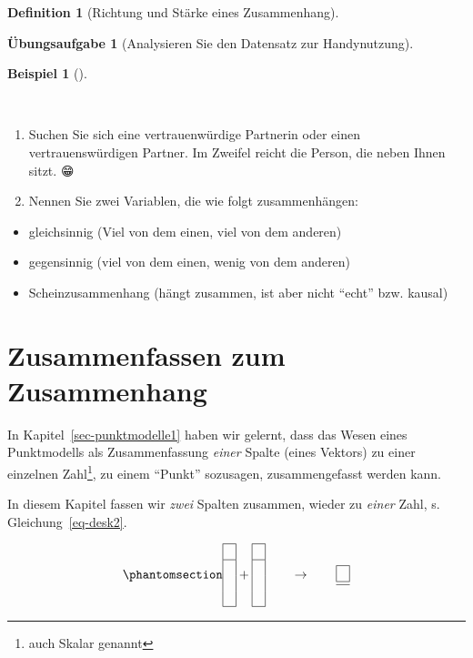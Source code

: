 \documentclass[
  a4paper,
  DIV=11]{scrreprt}
\providecommand{\tightlist}{%
  \setlength{\itemsep}{0pt}\setlength{\parskip}{0pt}}\usepackage{longtable,booktabs,array}
\theoremstyle{definition}
\newtheorem{exercise}{Übungsaufgabe}[chapter]
\theoremstyle{definition}
\newtheorem{example}{Beispiel}[chapter]
\theoremstyle{definition}
\newtheorem{definition}{Definition}[chapter]
\theoremstyle{remark}
\begin{document}
\begin{definition}[Richtung und Stärke eines
Zusammenhang]
\begin{exercise}[Analysieren Sie den Datensatz zur
Handynutzung]
\begin{example}[]\protect\hypertarget{exm-zsgh-studis}{}\label{exm-zsgh-studis}

~

\begin{enumerate}
\def\labelenumi{\arabic{enumi}.}
\tightlist
\item
  Suchen Sie sich eine vertrauenwürdige Partnerin oder einen
  vertrauenswürdigen Partner. Im Zweifel reicht die Person, die neben
  Ihnen sitzt. {😁}
\item
  Nennen Sie zwei Variablen, die wie folgt zusammenhängen:
\end{enumerate}

\begin{itemize}
\tightlist
\item
  gleichsinnig (Viel von dem einen, viel von dem anderen)
\item
  gegensinnig (viel von dem einen, wenig von dem anderen)
\item
  Scheinzusammenhang (hängt zusammen, ist aber nicht ``echt'' bzw.
  kausal)
\end{itemize}

\end{example}

\section{Zusammenfassen zum
Zusammenhang}\label{zusammenfassen-zum-zusammenhang}

In Kapitel~\ref{sec-punktmodelle1} haben wir gelernt, dass das Wesen
eines Punktmodells als Zusammenfassung \emph{einer} Spalte (eines
Vektors) zu einer einzelnen Zahl\footnote{auch Skalar genannt}, zu einem
``Punkt'' sozusagen, zusammengefasst werden kann.

In diesem Kapitel fassen wir \emph{zwei} Spalten zusammen, wieder zu
\emph{einer} Zahl, s. Gleichung~\ref{eq-desk2}.

\begin{equation}\phantomsection\label{eq-desk2}{\begin{array}{|c|} \hline \\ \hline \\\\\\ \hline \end{array} + \begin{array}{|c|} \hline \\ \hline \\\\\\ \hline \end{array} \qquad \rightarrow \qquad \begin{array}{|c|} \hline \\ \hline  \hline \end{array}}\end{equation}


\end{exercise}
\end{definition}
\end{document}
